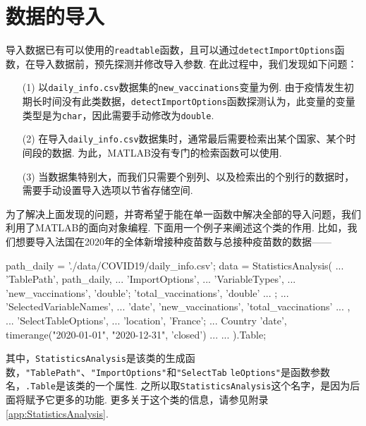 \documentclass[a4paper, titlepage]{article}
\begin{document}
    \section{数据的导入}\label{数据的导入}
        导入数据已有可以使用的\texttt{readtable}函数，且可以通过\texttt{detectImportOptions}函数，在导入数据前，预先探测并修改导入参数. 在此过程中，我们发现如下问题：
        \begin{enumerate}
            \item [(1)] 以\texttt{daily\_info.csv}数据集的\texttt{new\_vaccinations}变量为例. 由于疫情发生初期长时间没有此类数据，\texttt{detectImportOptions}函数探测认为，此变量的变量类型是为\texttt{char}，因此需要手动修改为\texttt{double}.
            \item [(2)] 在导入\texttt{daily\_info.csv}数据集时，通常最后需要检索出某个国家、某个时间段的数据. 为此，MATLAB没有专门的检索函数可以使用.
            \item [(3)] 当数据集特别大，而我们只需要个别列、以及检索出的个别行的数据时，需要手动设置导入选项以节省存储空间.
        \end{enumerate}
        为了解决上面发现的问题，并寄希望于能在单一函数中解决全部的导入问题，我们利用了MATLAB的面向对象编程. 下面用一个例子来阐述这个类的作用. 比如，我们想要导入法国在2020年的全体新增接种疫苗数与总接种疫苗数的数据——
\begin{matlabcode}
path_daily = './data/COVID19/daily_info.csv';
data = StatisticsAnalysis( ...
    'TablePath', path_daily, ...
    'ImportOptions', { ...
        'VariableTypes', { ...
            'new_vaccinations', 'double';
            'total_vaccinations', 'double' ...
            }; ...
        'SelectedVariableNames', ...
            {'date', 'new_vaccinations', 'total_vaccinations'} ...
        }, ...
    'SelectTableOptions', { ...
        'location', 'France'; ... Country
        'date', timerange("2020-01-01", "2020-12-31", 'closed') ...
    } ... %
    ).Table;
\end{matlabcode}
        \begin{sloppypar}
            \flushleft
            其中，\texttt{StatisticsAnalysis}是该类的生成函数，\texttt{"TablePath"}、\texttt{"ImportOptions"}和\texttt{"SelectTab} \texttt{leOptions"}是函数参数名，\texttt{.Table}是该类的一个属性. 之所以取\texttt{StatisticsAnalysis}这个名字，是因为后面将赋予它更多的功能. 更多关于这个类的信息，请参见附录\ref{app:StatisticsAnalysis}. %
        \end{sloppypar}
\end{document}
